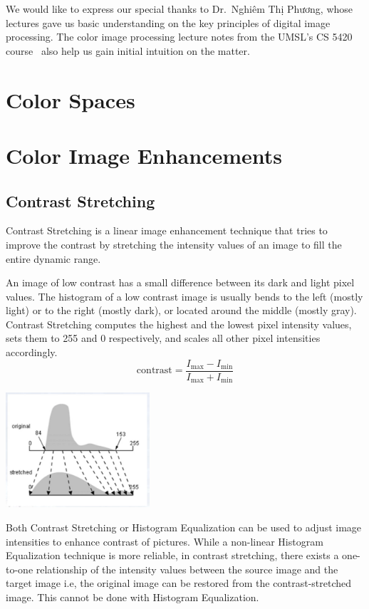 \documentclass[a4paper,12pt]{article}
\begin{document}
We would like to express our special thanks to Dr.~Nghiêm Thị Phương,
whose lectures gave us basic understanding on the key principles of
digital image processing.  The color image processing lecture notes from
the UMSL's CS 5420 course~\cite{cs5420} also help us gain initial intuition
on the matter.

\newpage
{}
\section{Color Spaces}

\section{Color Image Enhancements}
\subsection{Contrast Stretching}
Contrast Stretching is a linear image enhancement technique that tries to
improve the contrast by stretching the intensity values of an image to fill the
entire dynamic range.

An image of low contrast has a small difference between its dark and light
pixel values.  The histogram of a low contrast image is usually bends to the
left (mostly light) or to the right (mostly dark), or located around the middle
(mostly gray).  Contrast Stretching computes the highest and the lowest pixel
intensity values, sets them to 255 and 0 respectively, and scales all other
pixel intensities accordingly.
\[\mathrm{contrast} = \frac{I_\mathrm{max}-I_\mathrm{min}}
                           {I_\mathrm{max}+I_\mathrm{min}}\]

\begin{center}
  \includegraphics[width = 0.40\textwidth]{contrast-mapping.png}
\end{center}

Both Contrast Stretching or Histogram Equalization can be used to adjust image
intensities to enhance contrast of pictures.  While a non-linear Histogram
Equalization technique is more reliable, in contrast stretching, there exists a
one-to-one relationship of the intensity values between the source image and
the target image i.e, the original image can be restored from the
contrast-stretched image.  This cannot be done with Histogram Equalization.
 
\end{document}
